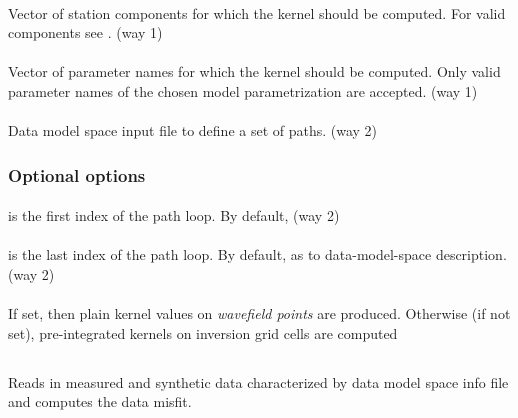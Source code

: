 \paragraph{ }
Vector of station components for which the kernel should be computed. 
For valid components see . (way 1)
\paragraph{ }
Vector of parameter names for which the kernel should be computed. 
Only valid parameter names of the chosen model parametrization are accepted. (way 1)
\paragraph{ }
Data model space input file to define a set of paths. (way 2)
\subsubsection{Optional options}
\paragraph{ }
 is the first index of the path loop. By default,  (way 2)
\paragraph{ }
 is the last index of the path loop. By default, 
 as to data-model-space description. (way 2)
\paragraph{}
If set, then plain kernel values on \emph{wavefield points} are produced. Otherwise (if not set), pre-integrated kernels on inversion grid cells are computed
%
%
\subsection{} \label{programs_scripts,sec:bin_prog,sec:comp_misfit}
Reads in measured and synthetic data characterized by data model space info file and computes the data misfit.

